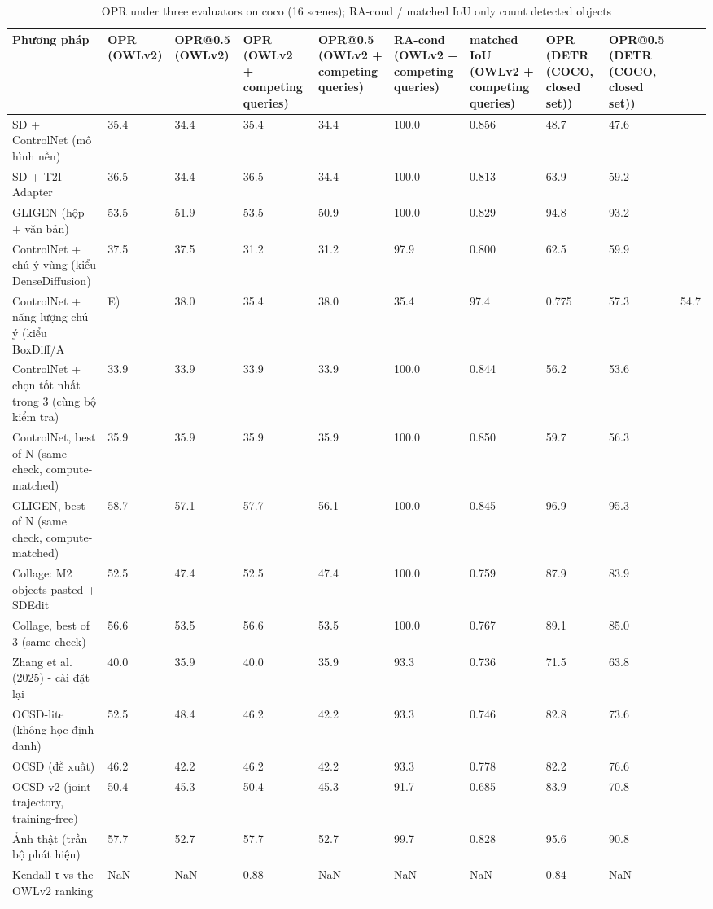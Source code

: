 \begin{table}
\caption{OPR under three evaluators on coco (16 scenes); RA-cond / matched IoU only count detected objects}
\begin{tabular}{lllllllll}
\toprule
Phương pháp & OPR (OWLv2) & OPR@0.5 (OWLv2) & OPR (OWLv2 + competing queries) & OPR@0.5 (OWLv2 + competing queries) & RA-cond (OWLv2 + competing queries) & matched IoU (OWLv2 + competing queries) & OPR (DETR (COCO, closed set)) & OPR@0.5 (DETR (COCO, closed set)) \\
\midrule
SD + ControlNet (mô hình nền) & 35.4 & 34.4 & 35.4 & 34.4 & 100.0 & 0.856 & 48.7 & 47.6 \\
SD + T2I-Adapter & 36.5 & 34.4 & 36.5 & 34.4 & 100.0 & 0.813 & 63.9 & 59.2 \\
GLIGEN (hộp + văn bản) & 53.5 & 51.9 & 53.5 & 50.9 & 100.0 & 0.829 & 94.8 & 93.2 \\
ControlNet + chú ý vùng (kiểu DenseDiffusion) & 37.5 & 37.5 & 31.2 & 31.2 & 97.9 & 0.800 & 62.5 & 59.9 \\
ControlNet + năng lượng chú ý (kiểu BoxDiff/A&E) & 38.0 & 35.4 & 38.0 & 35.4 & 97.4 & 0.775 & 57.3 & 54.7 \\
ControlNet + chọn tốt nhất trong 3 (cùng bộ kiểm tra) & 33.9 & 33.9 & 33.9 & 33.9 & 100.0 & 0.844 & 56.2 & 53.6 \\
ControlNet, best of N (same check, compute-matched) & 35.9 & 35.9 & 35.9 & 35.9 & 100.0 & 0.850 & 59.7 & 56.3 \\
GLIGEN, best of N (same check, compute-matched) & 58.7 & 57.1 & 57.7 & 56.1 & 100.0 & 0.845 & 96.9 & 95.3 \\
Collage: M2 objects pasted + SDEdit & 52.5 & 47.4 & 52.5 & 47.4 & 100.0 & 0.759 & 87.9 & 83.9 \\
Collage, best of 3 (same check) & 56.6 & 53.5 & 56.6 & 53.5 & 100.0 & 0.767 & 89.1 & 85.0 \\
Zhang et al. (2025) - cài đặt lại & 40.0 & 35.9 & 40.0 & 35.9 & 93.3 & 0.736 & 71.5 & 63.8 \\
OCSD-lite (không học định danh) & 52.5 & 48.4 & 46.2 & 42.2 & 93.3 & 0.746 & 82.8 & 73.6 \\
OCSD (đề xuất) & 46.2 & 42.2 & 46.2 & 42.2 & 93.3 & 0.778 & 82.2 & 76.6 \\
OCSD-v2 (joint trajectory, training-free) & 50.4 & 45.3 & 50.4 & 45.3 & 91.7 & 0.685 & 83.9 & 70.8 \\
Ảnh thật (trần bộ phát hiện) & 57.7 & 52.7 & 57.7 & 52.7 & 99.7 & 0.828 & 95.6 & 90.8 \\
Kendall τ vs the OWLv2 ranking & NaN & NaN & 0.88 & NaN & NaN & NaN & 0.84 & NaN \\
\bottomrule
\end{tabular}
\end{table}

